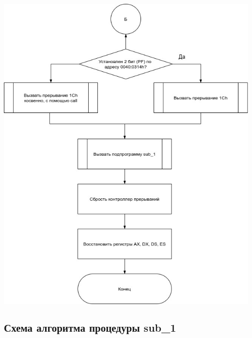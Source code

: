 \documentclass[12pt]{extreport}
\begin{document}
\begin{center}
\includegraphics[scale=0.6]{./inc/img/int8h_3.jpg} 
\end{center}

\clearpage
\subsection{Схема алгоритма процедуры sub\_1}
\end{document}
